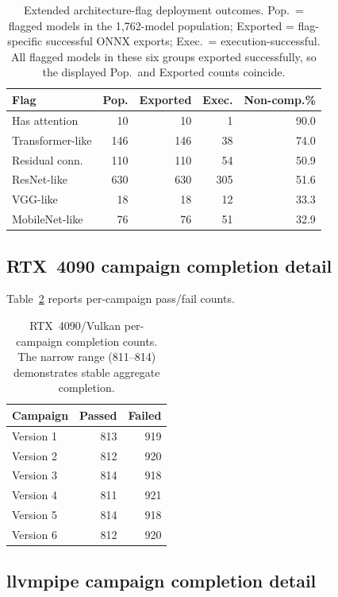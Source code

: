 \documentclass[10pt,twocolumn]{article}
\begin{document}
\begin{table}[h]
\centering\scriptsize
\setlength{\tabcolsep}{2pt}
\begin{tabular}{@{}lrrrr@{}}
\toprule
Flag & Pop. & Exported & Exec. & Non-comp.\% \\
\midrule
Has attention & 10 & 10 & 1 & 90.0 \\
Transformer-like & 146 & 146 & 38 & 74.0 \\
Residual conn. & 110 & 110 & 54 & 50.9 \\
ResNet-like & 630 & 630 & 305 & 51.6 \\
VGG-like & 18 & 18 & 12 & 33.3 \\
MobileNet-like & 76 & 76 & 51 & 32.9 \\
\bottomrule
\end{tabular}
\caption{Extended architecture-flag deployment outcomes. Pop.\ = flagged models in the 1,762-model population; Exported = flag-specific successful ONNX exports; Exec.\ = execution-successful. All flagged models in these six groups exported successfully, so the displayed Pop.\ and Exported counts coincide.}
\label{tab:appendix_families}
\end{table}

\subsection{RTX~4090 campaign completion detail}

Table~\ref{tab:appendix_campaigns} reports per-campaign pass/fail counts.

\begin{table}[h]
\centering\small
\begin{tabular}{lrr}
\toprule
Campaign & Passed & Failed \\
\midrule
Version 1 & 813 & 919 \\
Version 2 & 812 & 920 \\
Version 3 & 814 & 918 \\
Version 4 & 811 & 921 \\
Version 5 & 814 & 918 \\
Version 6 & 812 & 920 \\
\bottomrule
\end{tabular}
\caption{RTX~4090/Vulkan per-campaign completion counts. The narrow range (811--814) demonstrates stable aggregate completion.}
\label{tab:appendix_campaigns}
\end{table}

\subsection{llvmpipe campaign completion detail}
\end{document}
